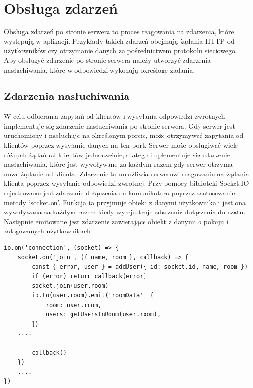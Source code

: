 \section{Obsługa zdarzeń}
Obsługa zdarzeń po stronie serwera to proces reagowania na zdarzenia, które występują w aplikacji. Przykłady takich zdarzeń obejmują żądania HTTP od użytkowników czy otrzymanie danych za pośrednictwem protokołu sieciowego. Aby obsłużyć zdarzenie po stronie serwera należy utworzyć zdarzenia nasłuchiwania, które w odpowiedzi wykonują określone zadania.
\subsection{Zdarzenia nasłuchiwania}
W celu odbierania zapytań od klientów i wysyłania odpowiedzi zwrotnych implementuje się zdarzenie nasłuchiwania po stronie serwera. Gdy serwer jest uruchomiony i nasłuchuje na określonym porcie, może otrzymywać zapytania od klientów poprzez wysyłanie danych na ten port. Serwer może obsługiwać wiele różnych żądań od klientów jednocześnie, dlatego implementuje się zdarzenie nasłuchiwania, które jest wywoływane za każdym razem gdy serwer otrzyma nowe żądanie od klienta. Zdarzenie to umożliwia serwerowi reagowanie na żądania klienta poprzez wysyłanie odpowiedzi zwrotnej. 
Przy pomocy biblioteki Socket.IO rejestrowane jest zdarzenie dołączenia do komunikatora poprzez zastosowanie metody ‘socket.on’. Funkcja ta przyjmuje obiekt z danymi użytkownika i jest ona wywoływana za każdym razem kiedy wyrejestruje zdarzenie dołączenia do czatu. Następnie emitowane jest zdarzenie zawierające obiekt z danymi o pokoju i zalogowanych użytkownikach.
\begin{lstlisting}[caption=Implementacja zdarzenia dolaczenia i pobierania danych]
io.on('connection', (socket) => {
    socket.on('join', ({ name, room }, callback) => {
        const { error, user } = addUser({ id: socket.id, name, room })
        if (error) return callback(error)
        socket.join(user.room)
        io.to(user.room).emit('roomData', {
            room: user.room,
            users: getUsersInRoom(user.room),
        })
	....		

        callback()
    })
	....
})
\end{lstlisting}

